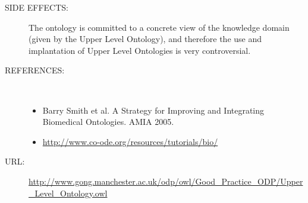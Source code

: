 \begin{description}
\item [SIDE EFFECTS:] The ontology is committed to a concrete view of the knowledge domain (given by the Upper Level Ontology), and therefore the use and implantation of Upper Level Ontologies is very controversial.

\item [REFERENCES: ] ~\begin{itemize}
\item Barry Smith et al. A Strategy for Improving and Integrating Biomedical Ontologies. AMIA 2005.
\item \url{http://www.co-ode.org/resources/tutorials/bio/}\end{itemize}
\item [URL: ] \url{http://www.gong.manchester.ac.uk/odp/owl/Good_Practice_ODP/Upper_Level_Ontology.owl} \end{description}